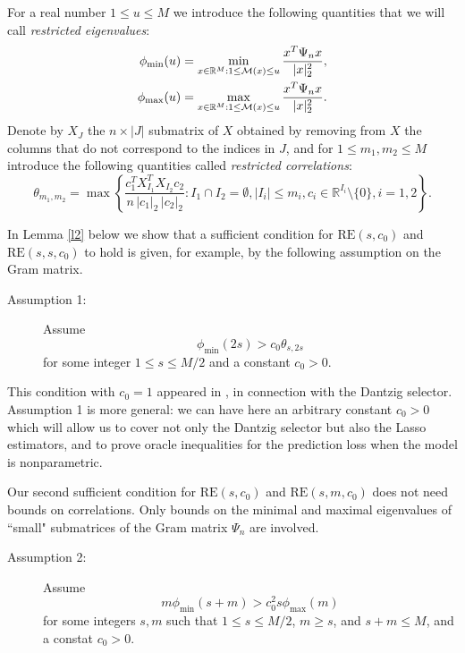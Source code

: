\documentclass[dvips,aos]{imsart}
\numberwithin{equation}{section}
\theoremstyle{plain}
\def\scm{{\cal M}}
\def\RR{\mathbb R}
\def\RE#1#2{$\text{RE}(#1,#2)$}
\def\REm#1#2#3{$\text{RE}(#1,#2,#3)$}
\begin{document}
For a real number $1\le u\le M$ we introduce the following
quantities that we will call {\it restricted eigenvalues}:
\begin{equation*}%
\begin{split}
\phi_{\min}(u) &= \min_{x\in \RR^M: 1\le \scm(x) \le u }
\frac{x^T\Psi_n
x}{|x|_2^2}, \\
 \phi_{\max}(u) &= \max_{x\in \RR^M: 1\le \scm(x) \le
u } \frac{x^T\Psi_n x}{|x|_2^2}.
\end{split}
\end{equation*}
Denote by $X_J$ the $n\times |J|$ submatrix of $X$ obtained by
removing from $X$ the columns that do not correspond to the indices
in $J$, and for $1\le m_1,m_2\le M$ introduce the following
quantities called {\it restricted correlations}:
\begin{equation*}
\theta_{m_1,m_2} = \max\left\{ \frac{
c_1^TX_{I_1}^TX_{I_2}c_2}{n\,|c_1|_2\,|c_2|_2}: I_1\cap
I_2=\emptyset, |I_i|\leq m_i, c_i\in\RR^{I_i}\setminus \{0\}, i=1,2
\right\}.
\end{equation*}

In Lemma \ref{l2} below we show that a sufficient condition for \RE
s{c_0} and \REm ss{c_0} to hold is given, for example, by the
following assumption on the Gram matrix.



\begin{description}
\item[Assumption 1:]Assume
$$
\phi_{\min}(2s) > c_0\theta_{s,2s}
$$
for some integer $1\le s \le M/2$ and a constant $c_0>0$.
\end{description}


This condition with $c_0=1$ appeared in \cite{ct07}, in connection
with the Dantzig selector. Assumption 1 is more general: we can have
here an arbitrary constant $c_0>0$ which will allow us to cover not
only the Dantzig selector but also the Lasso estimators, and to
prove oracle inequalities for the prediction loss when the model is
nonparametric.

Our second sufficient condition for \RE s{c_0} and \REm sm{c_0} does
not need bounds on correlations. Only bounds on the minimal and
maximal eigenvalues of ``small" submatrices of the Gram matrix
$\Psi_n$ are involved.



\begin{description}
\item[Assumption 2:] Assume
$$
m\phi_{\min}(s+m) > c_0^2 s\phi_{\max}(m)
$$
for some integers $s,m$ such that $1\le s \le M/2$, $m\ge s$, and
$s+m\le M$, and a constat $c_0>0$.
\end{description}
\end{document}
